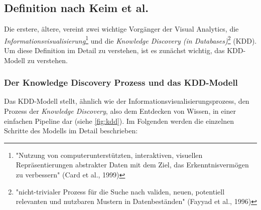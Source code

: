 		\subsection{Definition nach Keim et al.}
			Die erstere, ältere, vereint zwei wichtige Vorgänger der Visual Analytics, die \emph{Informationsvisualisierung}\footnote{"Nutzung von computerunterstützten, interaktiven, visuellen Repräsentierungen abstrakter Daten mit dem Ziel, das Erkenntnisvermögen zu verbessern" (Card et al., 1999)} und die \emph{Knowledge Discovery (in Databases)}\footnote{"nicht-trivialer Prozess für die Suche nach validen, neuen, potentiell relevanten und nutzbaren Mustern in Datenbeständen" (Fayyad et al., 1996)} (KDD). Um diese Definition im Detail zu verstehen, ist es zunächst wichtig, das KDD-Modell zu verstehen.

			\subsubsection{Der Knowledge Discovery Prozess und das KDD-Modell}
				Das KDD-Modell stellt, ähnlich wie der Informationsvisualisierungsprozess, den Prozess der \emph{Knowledge Discovery}, also dem Entdecken von Wissen, in einer einfachen Pipeline dar (siehe \autoref{fig:kdd}). Im Folgenden werden die einzelnen Schritte des Modells im Detail beschrieben:
